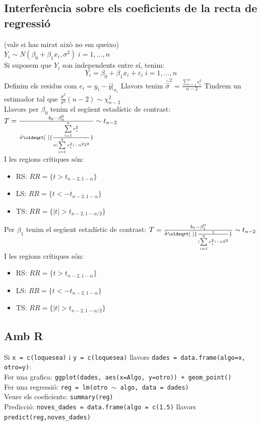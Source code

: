 \documentclass[a4paper]{sciposter}
\renewcommand*{\sqrt}[2][\ ]{\oldsqrt[#1]{#2} }
\begin{document}
\begin{multicols}{3}
\subsection{Interferència sobre els coeficients de la recta de regressió}
(vale si has mirat això no em queixo)\\
$Y_i \sim N(\beta_0+\beta_1x_i, \sigma^2)\; i = 1, \dots, n$\\
Si suposem que $Y_i$ son independents entre sí, tenim:
\begin{displaymath}
    Y_i = \beta_0 + \beta_1x_i + \varepsilon_i \; i=1,\dots,n
\end{displaymath}
Definim els residus com $e_i = y_i - \hat{y}|_{x_i}$
Llavors tenim $\hat{\hat{\sigma}}^2 = \frac{\sum\limits_{i=1}^{n}e_i^2}{n-2}$
Tindrem un estimador tal que $\frac{\hat{\sigma}^2}{\sigma^2}(n-2) \sim \chi^2_{n-2}$\\
Llavors per $\beta_0$ tenim el següent estadístic de contrast: $T = \frac{b_0 - \beta_0^0}{\hat{\hat{\sigma}}\sqrt{\frac{\sum\limits_{i=1}^nx_i^2}{n(\sum\limits_{i=1}^nx_i^2) - n^2\overline{x}^2}}} \sim t_{n-2}$\\
I les regions crítiques són:
\begin{itemize}
	\item RS: $RR = \{t > t_{n-2,1-\alpha}\}$
	\item LS: $RR = \{t < -t_{n-2,1-\alpha}\}$
	\item TS: $RR = \{|t| > t_{n-2,1-\alpha/2}\}$
\end{itemize}
Per $\beta_1$ tenim el següent estadístic de contrast: $T = \frac{b_1 - \beta_1^0}{\hat{\hat{\sigma}}\sqrt{\frac{1}{(\sum\limits_{i=1}^nx_i^2) - n\overline{x}^2}}} \sim t_{n-2}$\\
I les regions crítiques són:
\begin{itemize}
	\item RS: $RR = \{t > t_{n-2,1-\alpha}\}$
	\item LS: $RR = \{t < -t_{n-2,1-\alpha}\}$
	\item TS: $RR = \{|t| > t_{n-2,1-\alpha/2}\}$
\end{itemize}
\subsection{Amb R}
Si \texttt{x = c(loquesea)} i \texttt{y = c(loquesea)} llavors \texttt{dades = data.frame(algo=x, otro=y)}:\\
Fer una grafica: \texttt{ggplot(dades, aes(x=Algo, y=otro)) + geom\_point()}\\
Fer una regressió: \texttt{reg = lm(otro $\sim$ algo, data = dades)}\\
Veure els coeficients: \texttt{summary(reg)}\\
Predicció: \texttt{noves\_dades = data.frame(algo = c(1.5)} llavors \texttt{predict(reg,noves\_dades)}\\
\end{multicols}
\end{document}
